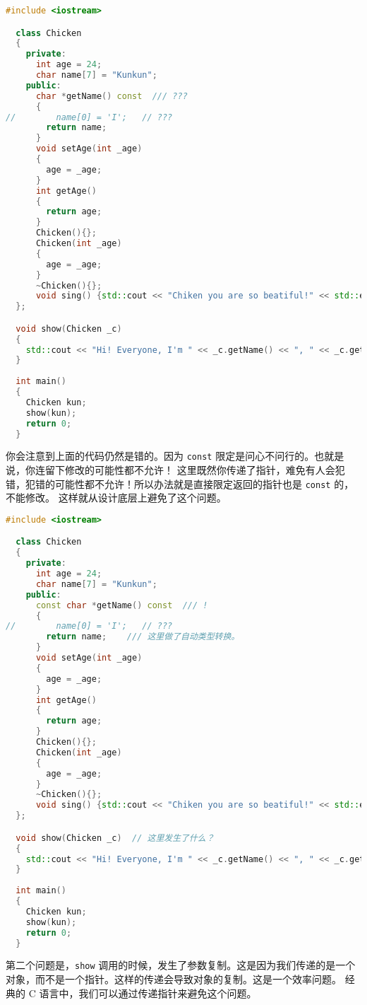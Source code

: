 \documentclass[a4paper]{ctexart}
\theoremstyle{definition}
\theoremstyle{definition}
\begin{document}
\begin{lstlisting}[language=C++]
  #include <iostream>

  class Chicken
  {
    private:
      int age = 24;
      char name[7] = "Kunkun";
    public:
      char *getName() const  /// ???
      {
//        name[0] = 'I';   // ???
        return name;
      }
      void setAge(int _age)
      {
        age = _age;
      }
      int getAge()
      {
        return age;
      }
      Chicken(){};
      Chicken(int _age)
      {
        age = _age;
      }
      ~Chicken(){};
      void sing() {std::cout << "Chiken you are so beatiful!" << std::endl;}      
  };

  void show(Chicken _c)
  {
    std::cout << "Hi! Everyone, I'm " << _c.getName() << ", " << _c.getAge() << " years old." << std::endl;
  }
  
  int main()
  {
    Chicken kun;
    show(kun);
    return 0;
  }
\end{lstlisting}

你会注意到上面的代码仍然是错的。因为 \verb|const| 限定是问心不问行的。也就是说，你连留下修改的可能性都不允许！
这里既然你传递了指针，难免有人会犯错，犯错的可能性都不允许！所以办法就是直接限定返回的指针也是 \verb|const| 的，不能修改。
这样就从设计底层上避免了这个问题。

\begin{lstlisting}[language=C++]
  #include <iostream>

  class Chicken
  {
    private:
      int age = 24;
      char name[7] = "Kunkun";
    public:
      const char *getName() const  /// !
      {
//        name[0] = 'I';   // ???
        return name;    /// 这里做了自动类型转换。
      }
      void setAge(int _age)
      {
        age = _age;
      }
      int getAge()
      {
        return age;
      }
      Chicken(){};
      Chicken(int _age)
      {
        age = _age;
      }
      ~Chicken(){};
      void sing() {std::cout << "Chiken you are so beatiful!" << std::endl;}      
  };

  void show(Chicken _c)  // 这里发生了什么？
  {
    std::cout << "Hi! Everyone, I'm " << _c.getName() << ", " << _c.getAge() << " years old." << std::endl;
  }
  
  int main()
  {
    Chicken kun;
    show(kun);
    return 0;
  }
\end{lstlisting}

第二个问题是，\verb|show| 调用的时候，发生了参数复制。这是因为我们传递的是一个对象，而不是一个指针。这样的传递会导致对象的复制。这是一个效率问题。
经典的 C 语言中，我们可以通过传递指针来避免这个问题。
\end{document}
